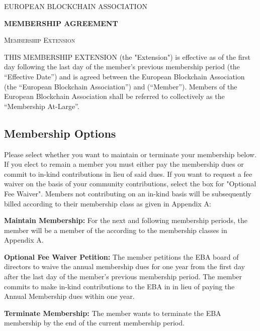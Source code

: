 \documentclass{article}
\begin{document}


{\scshape\LARGE EUROPEAN BLOCKCHAIN ASSOCIATION \centering \par}
\vspace{0.4cm}
{\huge\bfseries MEMBERSHIP AGREEMENT \centering \par}
\vspace{0.4cm}
{\scshape\LARGE Membership Extension \centering \par}
\vspace{0.8cm}


THIS MEMBERSHIP EXTENSION (the "Extension") is effective as of the first day following the last day of the member's previous membership period (the “Effective Date”) and is agreed between the European Blockchain Association (the “European Blockchain Association”) and  (“Member”). Members of the European Blockchain Association shall be referred to collectively as the “Membership At-Large”. \\

\subsection*{Membership Options}
Please select whether you want to maintain or terminate your membership below.  If you elect to remain a member you must either pay the membership dues or commit to in-kind contributions in lieu of said dues. If you want to request a fee waiver on the basis of your community contributions, select the box for "Optional Fee Waiver". Members not contributing on an in-kind basis will be subsequently billed according to their membership class as given in Appendix A: \\ 

\begin{options}
    \item \textbf{Maintain Membership:} For the next and following membership periods, the member will be a member of the   according to the membership classes in Appendix A. \\
     \item \textbf{Optional Fee Waiver Petition:} The member petitions the EBA board of directors to waive the annual membership dues for one year from the first day after the last day of the member's previous membership period. The member commits to make in-kind contributions to the EBA in in lieu of paying the Annual Membership dues within one year. 
    \item \textbf{Terminate Membership:} The member wants to terminate the EBA membership by the end of the current membership period.
\end{options}
\end{document}

